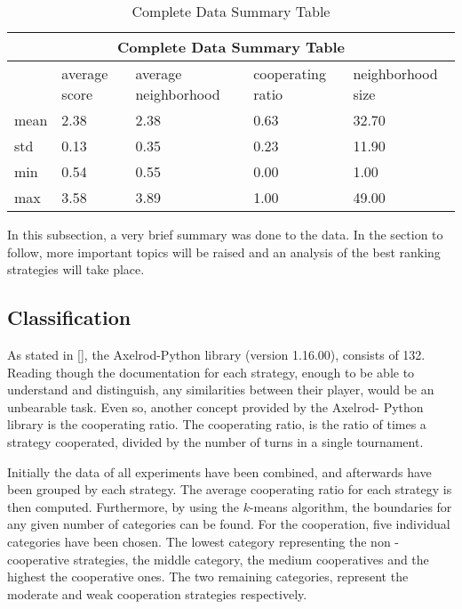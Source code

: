 \begin{table}[!hbtp]
	\centering
	\begin{adjustbox}{width=0.8\textwidth}
		\small
		\begin{tabular}{|l|l|l|l|l|}
			\hline
			\multicolumn{5}{|c|}{Complete Data Summary Table}                                      \\ \hline
			     & average score & average neighborhood & cooperating ratio & neighborhood size \\ \hline
			mean & 2.38          & 2.38                 & 0.63              & 32.70             \\ \hline
			std  & 0.13          & 0.35                 & 0.23              & 11.90             \\ \hline
			min  & 0.54          & 0.55                 & 0.00              & 1.00              \\ \hline
			max  & 3.58          & 3.89                 & 1.00              & 49.00             \\ \hline
		\end{tabular}
	\end{adjustbox}
	\caption{Complete Data Summary Table}
	\label{summary-complete-data}
\end{table}

In this subsection, a very brief summary was done to the data. In the section
to follow, more important topics will be raised and an analysis of the best
ranking strategies will take place.

\subsection{Classification}
\label{sub:four-classification}
As stated in [], the Axelrod-Python library (version 1.16.00), consists of 132.
Reading though the documentation for each strategy, enough to be able to
understand and distinguish, any similarities between their player, would be an
unbearable task. Even so, another concept provided by the Axelrod- Python library
is the cooperating ratio. The cooperating ratio, is the ratio of times
a strategy cooperated, divided by the number of turns in a single tournament.

Initially the data of all experiments have been combined, and afterwards have been
grouped by each strategy. The average cooperating ratio for each strategy is then
computed. Furthermore, by using the \(k\)-means algorithm, the boundaries for
any given number of categories can be found. For the cooperation, five individual
categories have been chosen. The lowest category representing the non - cooperative
strategies, the middle category, the medium cooperatives and the highest
the cooperative ones. The two remaining categories, represent the
moderate and weak cooperation strategies respectively.

